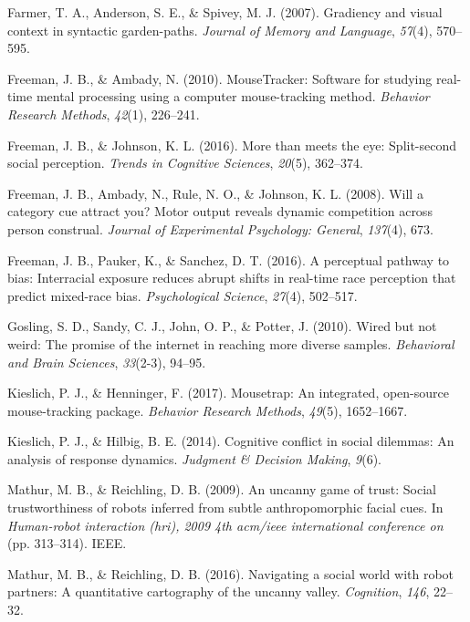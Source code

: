 \documentclass[]{article}
\begin{document}
\hypertarget{ref-farmer}{}
Farmer, T. A., Anderson, S. E., \& Spivey, M. J. (2007). Gradiency and
visual context in syntactic garden-paths. \emph{Journal of Memory and
Language}, \emph{57}(4), 570--595.

\hypertarget{ref-freeman_mousetracker}{}
Freeman, J. B., \& Ambady, N. (2010). MouseTracker: Software for
studying real-time mental processing using a computer mouse-tracking
method. \emph{Behavior Research Methods}, \emph{42}(1), 226--241.

\hypertarget{ref-freeman_more}{}
Freeman, J. B., \& Johnson, K. L. (2016). More than meets the eye:
Split-second social perception. \emph{Trends in Cognitive Sciences},
\emph{20}(5), 362--374.

\hypertarget{ref-freeman_cue}{}
Freeman, J. B., Ambady, N., Rule, N. O., \& Johnson, K. L. (2008). Will
a category cue attract you? Motor output reveals dynamic competition
across person construal. \emph{Journal of Experimental Psychology:
General}, \emph{137}(4), 673.

\hypertarget{ref-freeman_race}{}
Freeman, J. B., Pauker, K., \& Sanchez, D. T. (2016). A perceptual
pathway to bias: Interracial exposure reduces abrupt shifts in real-time
race perception that predict mixed-race bias. \emph{Psychological
Science}, \emph{27}(4), 502--517.

\hypertarget{ref-gosling}{}
Gosling, S. D., Sandy, C. J., John, O. P., \& Potter, J. (2010). Wired
but not weird: The promise of the internet in reaching more diverse
samples. \emph{Behavioral and Brain Sciences}, \emph{33}(2-3), 94--95.

\hypertarget{ref-mousetrap}{}
Kieslich, P. J., \& Henninger, F. (2017). Mousetrap: An integrated,
open-source mouse-tracking package. \emph{Behavior Research Methods},
\emph{49}(5), 1652--1667.

\hypertarget{ref-kieslich}{}
Kieslich, P. J., \& Hilbig, B. E. (2014). Cognitive conflict in social
dilemmas: An analysis of response dynamics. \emph{Judgment \& Decision
Making}, \emph{9}(6).

\hypertarget{ref-mathur2009}{}
Mathur, M. B., \& Reichling, D. B. (2009). An uncanny game of trust:
Social trustworthiness of robots inferred from subtle anthropomorphic
facial cues. In \emph{Human-robot interaction (hri), 2009 4th acm/ieee
international conference on} (pp. 313--314). IEEE.

\hypertarget{ref-uv2}{}
Mathur, M. B., \& Reichling, D. B. (2016). Navigating a social world
with robot partners: A quantitative cartography of the uncanny valley.
\emph{Cognition}, \emph{146}, 22--32.
\end{document}
